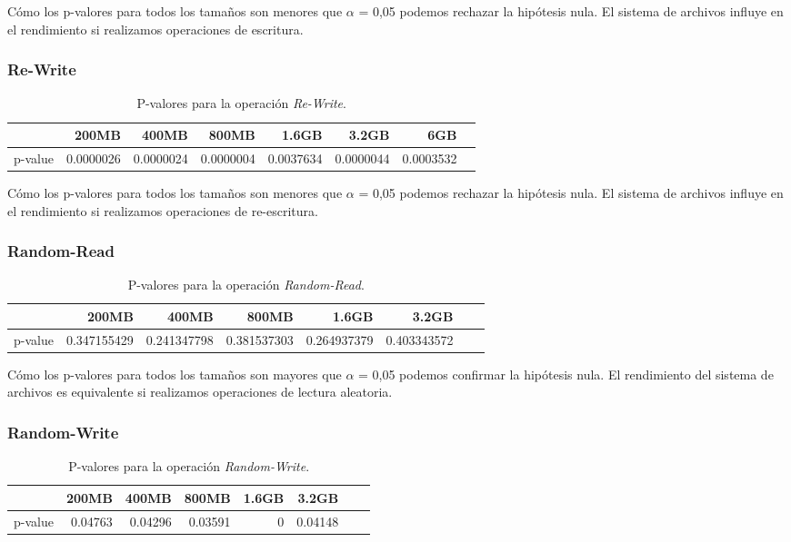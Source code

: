 Cómo los p-valores para todos los tamaños son menores que $\alpha$ = 0,05 podemos rechazar la hipótesis nula. El sistema de archivos influye en el rendimiento si realizamos operaciones de escritura. 

\subsubsection{Re-Write}
\begin{table}[!htp]\centering
\scriptsize
\begin{tabular}{lrrrrrrr}\toprule
&200MB &400MB &800MB &1.6GB &3.2GB &6GB \\\midrule
p-value &0.0000026 &0.0000024 &0.0000004 &0.0037634 &0.0000044 &0.0003532 \\
\bottomrule
\end{tabular}
\caption{P-valores para la operación \textit{Re-Write}.}\label{tab: }
\end{table}

Cómo los p-valores para todos los tamaños son menores que $\alpha$ = 0,05 podemos rechazar la hipótesis nula. El sistema de archivos influye en el rendimiento si realizamos operaciones de re-escritura. 

\subsubsection{Random-Read}
\begin{table}[!htp]\centering
\scriptsize
\begin{tabular}{lrrrrrrr}\toprule
&200MB &400MB &800MB &1.6GB &3.2GB \\\midrule
p-value &0.347155429 &0.241347798 &0.381537303 &0.264937379 &0.403343572 \\
\bottomrule
\end{tabular}
\caption{P-valores para la operación \textit{Random-Read}.}\label{tab: }
\end{table}

Cómo los p-valores para todos los tamaños son mayores que $\alpha$ = 0,05 podemos confirmar la hipótesis nula. El rendimiento del sistema de archivos es equivalente si realizamos operaciones de lectura aleatoria. 

\subsubsection{Random-Write}
\begin{table}[!htp]\centering
\scriptsize
\begin{tabular}{lrrrrrrr}\toprule
&200MB &400MB &800MB &1.6GB &3.2GB \\\midrule
p-value &0.04763 &0.04296 &0.03591 &0 &0.04148 \\
\bottomrule
\end{tabular}
\caption{P-valores para la operación \textit{Random-Write}.}\label{tab: }
\end{table}

